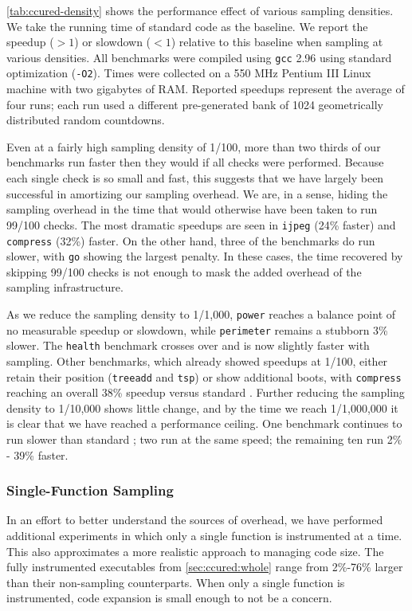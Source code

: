 \autoref{tab:ccured-density} shows the performance effect of various
sampling densities.  We take the running time of standard \CCured code
as the baseline.  We report the speedup ($>1$) or slowdown ($<1$)
relative to this baseline when sampling at various densities.  All
benchmarks were compiled using \texttt{gcc} 2.96 using standard
optimization (\texttt{-O2}).  Times were collected on a 550 MHz
Pentium III Linux machine with two gigabytes of RAM.  Reported
speedups represent the average of four runs; each run used a different
pre-generated bank of 1024 geometrically distributed random
countdowns.

Even at a fairly high sampling density of 1/100, more than two thirds
of our benchmarks run faster then they would if all checks were
performed.  Because each single check is so small and fast, this
suggests that we have largely been successful in amortizing our
sampling overhead.  We are, in a sense, hiding the sampling overhead
in the time that would otherwise have been taken to run 99/100 checks.
The most dramatic speedups are seen in \texttt{ijpeg} (24\% faster)
and \texttt{compress} (32\%) faster.  On the other hand, three of the
benchmarks do run slower, with \texttt{go} showing the largest
penalty.  In these cases, the time recovered by skipping 99/100 checks
is not enough to mask the added overhead of the sampling
infrastructure.

As we reduce the sampling density to 1/1,000, \texttt{power} reaches a
balance point of no measurable speedup or slowdown, while
\texttt{perimeter} remains a stubborn 3\% slower.  The \texttt{health}
benchmark crosses over and is now slightly faster with sampling.
Other benchmarks, which already showed speedups at 1/100, either
retain their position (\texttt{treeadd} and \texttt{tsp}) or show
additional boots, with \texttt{compress} reaching an overall 38\%
speedup versus standard \CCured.  Further reducing the sampling
density to 1/10,000 shows little change, and by the time we reach
1/1,000,000 it is clear that we have reached a performance ceiling.
One benchmark continues to run slower than standard \CCured; two run
at the same speed; the remaining ten run 2\% - 39\% faster.

\subsubsection{Single-Function Sampling}

In an effort to better understand the sources of overhead, we have
performed additional experiments in which only a single function is
instrumented at a time.  This also approximates a more realistic
approach to managing code size.  The fully instrumented executables
from \autoref{sec:ccured:whole} range from 2\%-76\% larger than their
non-sampling counterparts.  When only a single function is
instrumented, code expansion is small enough to not be a concern.

